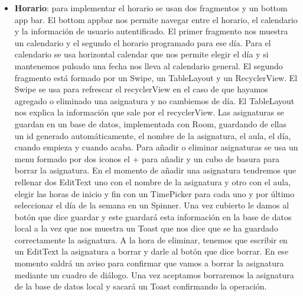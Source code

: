 \documentclass[a4paper,openright,12pt]{article}
\begin{document}
\begin{itemize}
    \item \textbf{Horario}: para implementar el horario se usan dos fragmentos y un bottom app bar. \newline
    El bottom appbar nos permite navegar entre el horario, el calendario y la información de usuario autentificado. \newline
    El primer fragmento nos muestra un calendario y el segundo el horario programado para ese día.
    Para el calendario se usa horizontal calendar\cite{misc-hc} que nos permite elegir el día y si mantenemos pulsado una fecha nos lleva al calendario general. \newline
    El segundo fragmento está formado por un Swipe, un TableLayout y un RecyclerView. El Swipe se usa para refrescar el recyclerView en el caso de que hayamos agregado o eliminado una asignatura y no cambiemos de día. El TableLayout nos explica la información que sale por el recyclerView. \newline 
    Las asignaturas se guardan en un base de datos, implementada con Room, guardando de ellas un id generado automáticamente, el nombre de la asignatura, el aula, el día, cuando empieza y cuando acaba. \newline
    Para añadir o eliminar asignaturas se usa un menu formado por dos iconos el + para añadir y un cubo de basura para borrar la asignatura.\newline
    En el momento de añadir una asignatura tendremos que rellenar dos EditText uno con el nombre de la asignatura y otro con el aula, elegir las horas de inicio y fin con un TimePicker para cada uno y por último seleccionar el día de la semana en un Spinner. Una vez cubierto le damos al botón que dice guardar y este guardará esta información en la base de datos local a la vez que nos muestra un Toast que nos dice que se ha guardado correctamente la asignatura.
    \newline
    A la hora de eliminar, tenemos que escribir en un EditText la asignatura a borrar y darle al botón que dice borrar. En ese momento saldrá un aviso para confirmar que vamos a borrar la asignatura mediante un cuadro de diálogo. Una vez aceptamos borraremos la asignatura de la base de datos local y sacará un Toast confirmando la operación.
    

\end{itemize}
\end{document}
